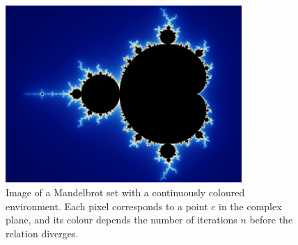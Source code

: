 %
\begin{figure}[htbp]
    \begin{center}
        \includegraphics[width=0.8\textwidth]{images/sec-5/mandelbrot}
    \end{center}
    \caption[The Mandelbrot fractal]{Image of a Mandelbrot set with a
        continuously coloured environment. Each pixel corresponds to a point $c$
        in the complex plane, and its colour depends the number of iterations
        $n$ before the relation diverges.}
    \label{fig:mandelbrot}
\end{figure}

